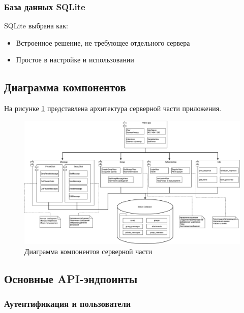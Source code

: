 \subsubsection{База данных SQLite}

SQLite выбрана как:
\begin{itemize}
	\item Встроенное решение, не требующее отдельного сервера
	\item Простое в настройке и использовании
\end{itemize}

\subsection{Диаграмма компонентов}

На рисунке \ref{fig:-components} представлена архитектура серверной части приложения.

\begin{figure}[ht]
	\centering
	\includegraphics[width=0.8\linewidth]{"images/Диаграмма компонентов"}
	\caption{Диаграмма компонентов серверной части}
	\label{fig:-components}
\end{figure}

\subsection{Основные API-эндпоинты}

\subsubsection{Аутентификация и пользователи}

